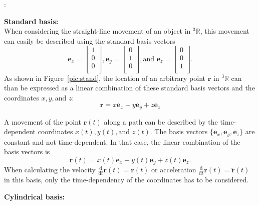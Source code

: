 \documentclass[10pt]{article}
\newcommand{\noin}{\noindent}
\newcommand{\veccoll}[3]{
        \begin{bmatrix}
                   #1\\
                   #2\\
                   #3\\
                 \end{bmatrix}}
\begin{document}
\vspace{0.2in}
{\large 
{} 

\vspace{0.2in}


}

\vfill


\pagebreak

\vspace{1cm}
\Large
\noin {\bf Preamble}: 
\normalsize
\bigskip

\noindent \textbf{Standard basis:}\\

When considering the straight-line movement of an object in ${}^3\mathbb{R}$, this
movement can easily be described using the standard basis vectors
\begin{equation*}
  \mathbf{e}_x = \veccoll{1}{0}{0},   \mathbf{e}_y = \veccoll{0}{1}{0},   \text{and } \mathbf{e}_z = \veccoll{0}{0}{1}.
\end{equation*}
As shown in Figure~\ref{pic:stand}, the location of an arbitrary point $\mathbf{r}$ in ${}^3\mathbb{R}$
can than be expressed as a linear combination of these standard basis vectors and the coordinates
$x,y, \text{and }z$:
\begin{equation*}
  \mathbf{r} = x \mathbf{e}_x + y \mathbf{e}_y + z \mathbf{e}_z
\end{equation*}

A movement of the point $\mathbf{r}(t)$ along a path can be described by the time-dependent
coordinates $x(t), y(t), \text{and }z(t)$. The basis vectors
$\{\mathbf{e}_x, \mathbf{e}_y, \mathbf{e}_z\}$ are constant and not time-dependent. In that case,
the linear combination of the basis vectors is
\begin{equation*}
  \mathbf{r}(t) = x(t) \mathbf{e}_x + y(t) \mathbf{e}_y + z(t) \mathbf{e}_z.
\end{equation*}
When calculating the velocity $\frac{\mathrm{d}}{\mathrm{d}t}\mathbf{r}(t) = \mathbf{\dot r}(t)$ or
acceleration $\frac{\mathrm{d}}{\mathrm{d}t}\mathbf{\dot r}(t) =\mathbf{\ddot r}(t)$ in this basis,
only the time-dependency of the coordinates has to be
considered. \\
\bigskip

\noindent \textbf{Cylindrical basis:}\\
\end{document}
